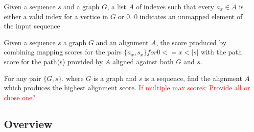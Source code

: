 \documentclass{article}
\begin{document}
\begin{defn}[Alignment]
	Given a sequence $s$ and a graph $G$, a list $A$ of indexes such that every $a_x \in A$ is either a valid index for a vertice in $G$ or $0$. $0$ indicates an unmapped element of the input sequence
\end{defn}
\begin{defn}
	Given a sequence $s$ a graph $G$ and an alignment $A$, the score produced by combining mapping scores for the pairs $\{a_x, s_x\} for 0<=x<|s|$ with the path score for the path(s) provided by $A$ aligned against both $G$ and $s$.
\end{defn}
\begin{defn}
	For any pair $\{G, s\}$, where $G$ is a graph and $s$ is a sequence, find the alignment $A$ which produces the highest alignment score.
	\textcolor{red}{If multiple max scores: Provide all or chose one?}
\end{defn}
\subsection{Overview}
\end{document}
